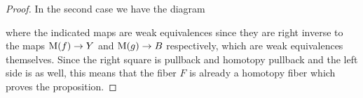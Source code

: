 \begin{lemma}
\begin{proof}
        In the second case we have the diagram
        \begin{center}
        \end{center}
        where the indicated maps are weak equivalences since they are right inverse to the maps $\operatorname{M}(f)\to Y$ and $\operatorname{M}(g)\to B$ respectively, which are weak equivalences themselves.
        Since the right square is pullback and homotopy pullback and the left side is as well, this means that the fiber $F$ is already a homotopy fiber which proves the proposition.
    \end{proof}
\end{lemma}
